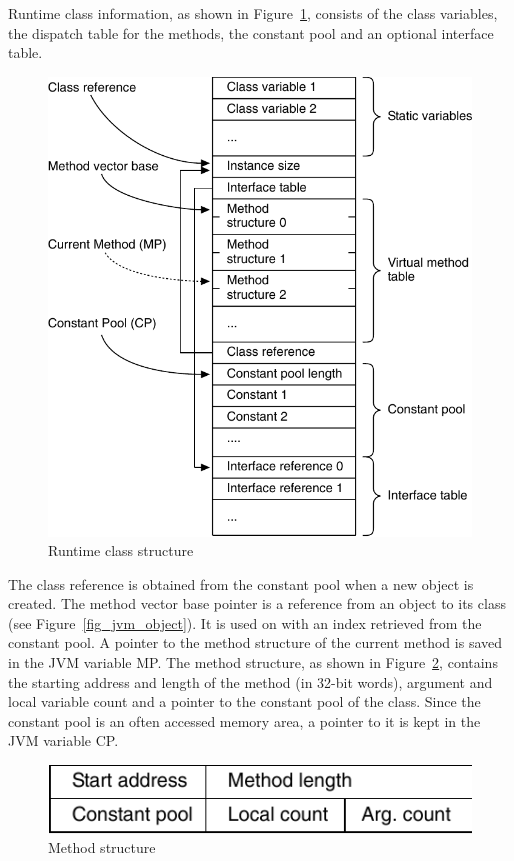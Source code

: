 Runtime class information, as shown in Figure~\ref{fig_jvm_class},
consists of the class variables, the dispatch table for the methods,
the constant pool and an optional interface table.

\begin{figure}
    \centering
    \includegraphics[scale=\picscale]{jvm/jvm_class}
    \caption{Runtime class structure}
    \label{fig_jvm_class}
\end{figure}


The class reference is obtained from the constant pool when a new
object is created. The method vector base pointer is a reference
from an object to its class (see Figure~\ref{fig_jvm_object}). It is
used on  with an index retrieved from the
constant pool. A pointer to the method structure of the current
method is saved in the JVM variable MP. The method structure, as
shown in Figure~\ref{fig_jvm_method}, contains the starting address
and length of the method (in 32-bit words), argument and local
variable count and a pointer to the constant pool of the class.
Since the constant pool is an often accessed memory area, a pointer
to it is kept in the JVM variable CP.

\begin{figure}
    \centering
    \includegraphics[scale=\picscale]{jvm/jvm_method}
    \caption{Method structure}
    \label{fig_jvm_method}
\end{figure}


